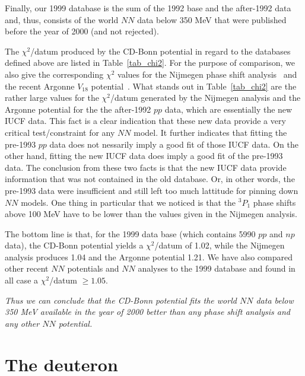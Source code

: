 Finally, our 1999 database is the sum of the 1992 base 
and the after-1992 data and,
thus, consists of the world $NN$ data below 350 MeV that were published before 
the year of 2000 (and not rejected).

The $\chi^2$/datum produced by the CD-Bonn potential
in regard to the databases defined above are listed 
in Table~\ref{tab_chi2}. For the purpose of comparison, we also give
the corresponding $\chi^2$ values for the Nijmegen phase shift
analysis~\cite{Sto93} and the recent 
Argonne $V_{18}$ potential~\cite{WSS95}.
What stands out in Table~\ref{tab_chi2} are the rather large values
for the $\chi^2$/datum generated by the Nijmegen analysis and the
Argonne potential for the the after-1992 $pp$ data, which are
essentially the new IUCF data. This fact is a clear indication that
these new data provide a very critical test/constraint for any $NN$
model. It further indicates that fitting the pre-1993 $pp$
data does not nessarily imply a good fit of those IUCF data. 
On the other hand, fitting the new IUCF data does imply a good fit of the
pre-1993 data. The conclusion from these two facts is that the new
IUCF data provide information that was not contained in the old database.
Or, in other words, the pre-1993 data were insufficient and still left
too much lattitude for pinning down $NN$ models.
One thing in particular that we noticed is that the $^3P_1$ phase
shifts above 100 MeV have to be lower than the values given in
the Nijmegen analysis.

The bottom line is that, for the 1999 data base (which contains 5990 $pp$
and $np$ data), the CD-Bonn potential yields a $\chi^2$/datum of 1.02,
while the Nijmegen analysis produces 1.04 and the Argonne potential
1.21. We have also compared other recent $NN$ potentials and $NN$ analyses
to the 1999 database and found in all case a $\chi^2$/datum $\geq 1.05$.

{\it Thus we can conclude that the CD-Bonn potential fits the world $NN$ data 
below 350 MeV available in the year of 2000 better than any phase 
shift analysis and any other $NN$ potential.}


\section{The deuteron}

